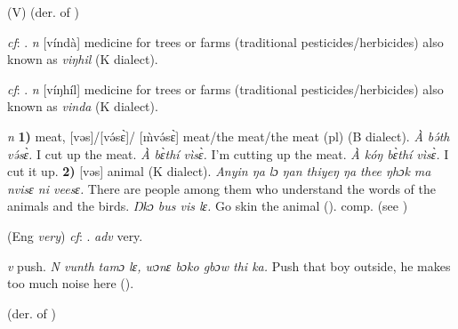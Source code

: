 \begin{letter}{(V)}
 (der. of ) 

 \textit{cf}: . \textit{n} [víndà] medicine for trees or farms (traditional pesticides/herbicides) also known as \textit{viŋhil} (K dialect). 

 \textit{cf}: . \textit{n} [víŋhíl] medicine for trees or farms (traditional pesticides/herbicides) also known as \textit{vinda} (K dialect). 

 \textit{n} \textbf{1)} meat, [vəs]/[və́sɛ̀]/ [\`{m}və́sɛ̀] meat/the meat/the meat (pl) (B dialect). \textit{À bə́th və́sɛ̀.} I cut up the meat. \textit{À bɛ̀thí vìsɛ̀.} I'm cutting up the meat. \textit{À kóŋ bɛ̀thí vìsɛ̀.} I cut it up. \textbf{2)} [vəs] animal (K dialect). \textit{Anyin ŋa lɔ ŋan thiyeŋ ŋa thee ŋhɔk ma nvisɛ ni veesɛ.} There are people among them who understand the words of the animals and the birds. \textit{Ŋkɔ bus vis lɛ.} Go skin the animal (\citealt{Pichl1967}). comp.  (see ) 

 (Eng \textit{very}) \textit{cf}: . \textit{adv} very.

 \textit{v} push. \textit{N vunth tamɔ lɛ, wɔnɛ bɔko gbɔw thi ka.} Push that boy outside, he makes too much noise here (\citealt{Pichl1967}).

 (der. of ) 

\end{letter}
